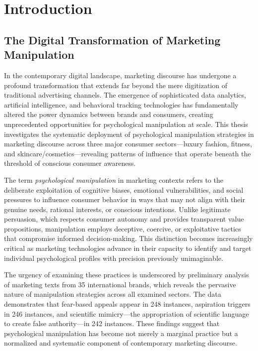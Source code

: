 
\chapter{Introduction}
\label{ch:introduction}

\section{The Digital Transformation of Marketing Manipulation}
\label{sec:digital_transformation}

In the contemporary digital landscape, marketing discourse has undergone a profound transformation that extends far beyond the mere digitization of traditional advertising channels. The emergence of sophisticated data analytics, artificial intelligence, and behavioral tracking technologies has fundamentally altered the power dynamics between brands and consumers, creating unprecedented opportunities for psychological manipulation at scale. This thesis investigates the systematic deployment of psychological manipulation strategies in marketing discourse across three major consumer sectors—luxury fashion, fitness, and skincare/cosmetics—revealing patterns of influence that operate beneath the threshold of conscious consumer awareness.

The term \emph{psychological manipulation} in marketing contexts refers to the deliberate exploitation of cognitive biases, emotional vulnerabilities, and social pressures to influence consumer behavior in ways that may not align with their genuine needs, rational interests, or conscious intentions. Unlike legitimate persuasion, which respects consumer autonomy and provides transparent value propositions, manipulation employs deceptive, coercive, or exploitative tactics that compromise informed decision-making. This distinction becomes increasingly critical as marketing technologies advance in their capacity to identify and target individual psychological profiles with precision previously unimaginable.

The urgency of examining these practices is underscored by preliminary analysis of marketing texts from 35 international brands, which reveals the pervasive nature of manipulation strategies across all examined sectors. The data demonstrates that fear-based appeals appear in 248 instances, aspiration triggers in 246 instances, and scientific mimicry—the appropriation of scientific language to create false authority—in 242 instances. These findings suggest that psychological manipulation has become not merely a marginal practice but a normalized and systematic component of contemporary marketing discourse.

